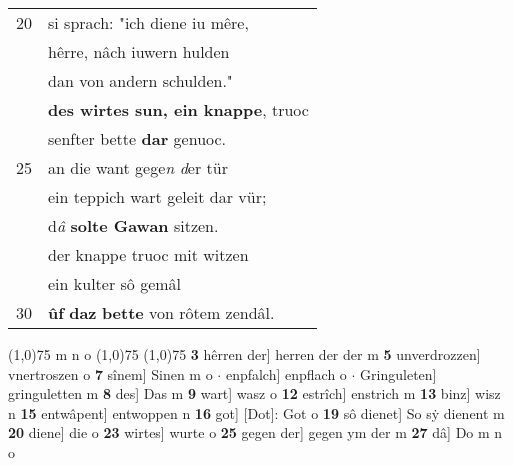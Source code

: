 \documentclass[8pt,a4paper,notitlepage]{article}
\begin{document}
\begin{table}[ht]
\begin{minipage}[t]{0.5\linewidth}
\begin{tabular}{rl}
20 & si sprach: "ich diene iu mêre,\\ 
 & hêrre, nâch iuwern hulden\\ 
 & dan von andern schulden."\\ 
 & \textbf{des wirtes sun, ein knappe}, truoc\\ 
 & senfter bette \textbf{dar} genuoc.\\ 
25 & an die want gege\textit{n} \textit{d}er tür\\ 
 & ein teppich wart geleit dar vür;\\ 
 & d\textit{â} \textbf{solte Gawan} sitzen.\\ 
 & der knappe truoc mit witzen\\ 
 & ein kulter sô gemâl\\ 
30 & \textbf{ûf} \textbf{daz} \textbf{bette} von rôtem zendâl.\\ 
\end{tabular}
\scriptsize
\line(1,0){75} \newline
m n o \newline
\line(1,0){75} \newline
\newline
\line(1,0){75} \newline
\textbf{3} hêrren der] herren der der m \textbf{5} unverdrozzen] vnertroszen o \textbf{7} sînem] Sinen m o  $\cdot$ enpfalch] enpflach o  $\cdot$ Gringuleten] gringuletten m \textbf{8} des] Das m \textbf{9} wart] wasz o \textbf{12} estrîch] enstrich m \textbf{13} binz] wisz n \textbf{15} entwâpent] entwoppen n \textbf{16} got] [Dot]: Got o \textbf{19} sô dienet] So sẏ dienent m \textbf{20} diene] die o \textbf{23} wirtes] wurte o \textbf{25} gegen der] gegen ym der m \textbf{27} dâ] Do m n o \newline
\end{minipage}
\end{table}
\newpage
\end{document}
